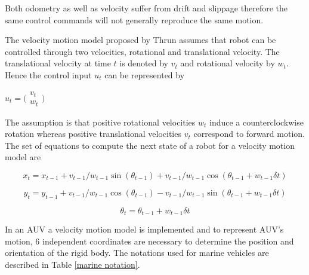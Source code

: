 \documentclass[12pt]{dalcsthesis}
\begin{document}
Both odometry as well as velocity suffer from drift and slippage therefore the same control commands will not generally reproduce the same motion.

The velocity motion model proposed by Thrun \cite{thrun2005probabilistic} assumes that robot can be controlled through two velocities, rotational and translational velocity. The translational velocity at time $t$ is denoted by $v_{t}$ and rotational velocity by $w_{t}$. Hence the control input $u_{t}$ can be represented by  
\begin{center}
$u_{t}=\bigl(\begin{array}{c}
                v_{t} \\
                w_{t}
               \end{array}\bigr)$
  
\end{center}

The assumption is that positive rotational velocities $w_{t}$ induce a counterclockwise rotation whereas positive translational velocities $v_{t}$ correspond to forward motion. The set of equations to compute the next state of a robot for a velocity motion model are 

\begin{equation}
x_{t}=x_{t-1}+v_{t-1}/w_{t-1} \sin(\theta_{t-1})+ v_{t-1}/w_{t-1} \cos(\theta_{t-1} + w_{t-1} \delta t)
\end{equation}

\begin{equation}
y_{t}=y_{t-1}+v_{t-1}/w_{t-1} \cos(\theta_{t-1})- v_{t-1}/w_{t-1} \sin(\theta_{t-1} + w_{t-1} \delta t)
\end{equation}

\begin{equation}
\theta_{t}=\theta_{t-1}+ w_{t-1} \delta t
\end{equation}
 


In an AUV a velocity motion model is implemented and to represent AUV's motion, 6 independent coordinates are necessary to determine the position and orientation of the rigid body. The notations used for marine vehicles are described in Table \ref{marine notation}. 
\end{document}
